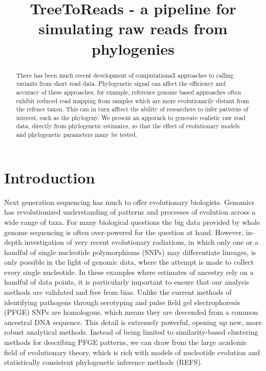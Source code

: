 \documentclass[a4paper,10pt]{article}
\title{TreeToReads - a pipeline for simulating raw reads from phylogenies}
\author{}
\begin{document}
\maketitle

\begin{abstract}
There has been much recent development of computationall approaches to calling variants from short read data.
Phylogenetic signal can affect the efficiency and accuracy of these approaches, for example, reference genome based approaches often exhibit
reduced read mapping from samples which are more evolutionarily distant from the refence taxon.
This can in turn afftect the ability of researchers to infer patterns of interest, such as the phylogeny.
We present an apporach to generate realistic raw read data, directly from phylogenetic estimates, 
so that the effect of evolutionary models and phylogenetic parameters many be tested.

\end{abstract}

\section{Introduction}
Next generation sequencing has much to offer evolutionary biologists.
Genomics has revolutionized understanding of patterns and processes of evolution across a wide range of taxa.
For many biological questions the big data provided by whole genome sequencing is often over-powered for the question at hand.
However, in-depth investigation of very recent evolutionary radiations, in which only one or a handful of single nucleotide polymorphisms (SNPs) may differentiate lineages, is only possible in the light of genomic data, where the attempt is made to collect every single nucleotide.
In these examples where estimates of ancestry rely on a handful of data points, it is particularly important to ensure that our analysis methods are validated and free from bias. 
Unlike the current methods of identifying pathogens through serotyping and pulse field gel electrophoresis (PFGE) SNPs are homologous, which means they are descended from a common ancestral DNA sequence.
This detail is extremely powerful, opening up new, more robust analytical methods.
Instead of being limited to similarity-based clustering methods for describing PFGE patterns, we can draw from the large academic field of evolutionary theory, which is rich with models of nucleotide evolution and statistically consistent phylogenetic inference methods (REFS).
\end{document}
